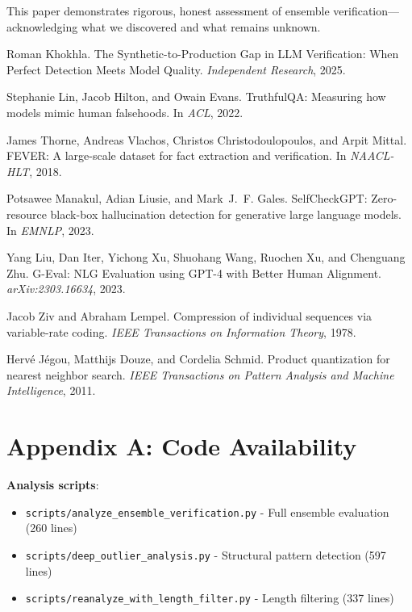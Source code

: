 \documentclass[11pt]{article}
\begin{document}
This paper demonstrates rigorous, honest assessment of ensemble verification---acknowledging what we discovered and what remains unknown.


\begin{thebibliography}{10}

Roman Khokhla.
\newblock The Synthetic-to-Production Gap in LLM Verification: When Perfect Detection Meets Model Quality.
\newblock \emph{Independent Research}, 2025.

Stephanie Lin, Jacob Hilton, and Owain Evans.
\newblock TruthfulQA: Measuring how models mimic human falsehoods.
\newblock In \emph{ACL}, 2022.

James Thorne, Andreas Vlachos, Christos Christodoulopoulos, and Arpit Mittal.
\newblock FEVER: A large-scale dataset for fact extraction and verification.
\newblock In \emph{NAACL-HLT}, 2018.

Potsawee Manakul, Adian Liusie, and Mark~J.~F. Gales.
\newblock SelfCheckGPT: Zero-resource black-box hallucination detection for generative large language models.
\newblock In \emph{EMNLP}, 2023.

Yang Liu, Dan Iter, Yichong Xu, Shuohang Wang, Ruochen Xu, and Chenguang Zhu.
\newblock G-Eval: NLG Evaluation using GPT-4 with Better Human Alignment.
\newblock \emph{arXiv:2303.16634}, 2023.

Jacob Ziv and Abraham Lempel.
\newblock Compression of individual sequences via variable-rate coding.
\newblock \emph{IEEE Transactions on Information Theory}, 1978.

Herv\'{e} J\'{e}gou, Matthijs Douze, and Cordelia Schmid.
\newblock Product quantization for nearest neighbor search.
\newblock \emph{IEEE Transactions on Pattern Analysis and Machine Intelligence}, 2011.

\end{thebibliography}

\section*{Appendix A: Code Availability}

\textbf{Analysis scripts}:
\begin{itemize}
\item \texttt{scripts/analyze\_ensemble\_verification.py} - Full ensemble evaluation (260 lines)
\item \texttt{scripts/deep\_outlier\_analysis.py} - Structural pattern detection (597 lines)
\item \texttt{scripts/reanalyze\_with\_length\_filter.py} - Length filtering (337 lines)
\end{itemize}
\end{document}
